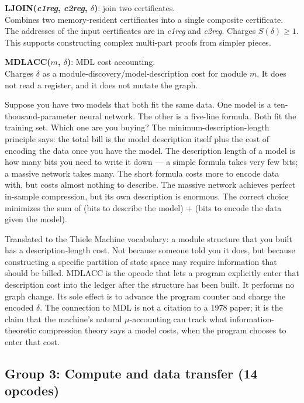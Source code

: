 \documentclass[11pt,a4paper]{article}
\theoremstyle{plain}
\theoremstyle{definition}
\theoremstyle{remark}
\begin{document}
\medskip
\noindent\textbf{LJOIN(\textit{c1reg}, \textit{c2reg}, $\delta$)}: join two certificates.\\
Combines two memory-resident certificates into a single composite certificate. The addresses of the input certificates are in \textit{c1reg} and \textit{c2reg}. Charges $S(\delta) \geq 1$. This supports constructing complex multi-part proofs from simpler pieces.

\medskip
\noindent\textbf{MDLACC($m$, $\delta$)}: MDL cost accounting.\\
Charges $\delta$ as a module-discovery/model-description cost for module $m$. It does not read a register, and it does not mutate the graph.

Suppose you have two models that both fit the same data. One model is a ten-thousand-parameter neural network. The other is a five-line formula. Both fit the training set. Which one are you buying? The minimum-description-length principle says: the total bill is the model description itself plus the cost of encoding the data once you have the model. The description length of a model is how many bits you need to write it down --- a simple formula takes very few bits; a massive network takes many. The short formula costs more to encode data with, but costs almost nothing to describe. The massive network achieves perfect in-sample compression, but its own description is enormous. The correct choice minimizes the sum of (bits to describe the model) + (bits to encode the data given the model).

Translated to the Thiele Machine vocabulary: a module structure that you built has a description-length cost. Not because someone told you it does, but because constructing a specific partition of state space may require information that should be billed. MDLACC is the opcode that lets a program explicitly enter that description cost into the ledger after the structure has been built. It performs no graph change. Its sole effect is to advance the program counter and charge the encoded $\delta$. The connection to MDL is not a citation to a 1978 paper; it is the claim that the machine's natural $\mu$-accounting can track what information-theoretic compression theory says a model costs, when the program chooses to enter that cost.

\subsection{Group 3: Compute and data transfer (14 opcodes)}
\end{document}
